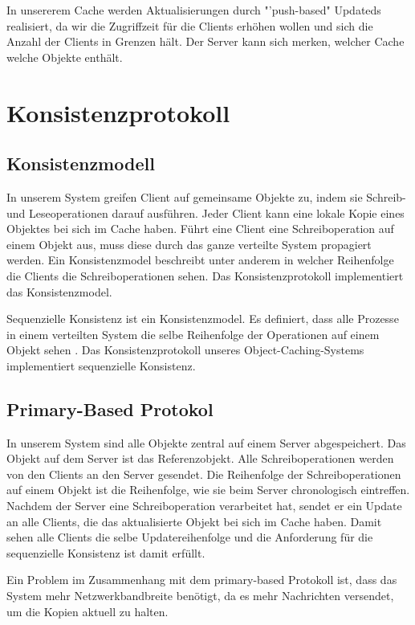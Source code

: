 In unsererem Cache werden Aktualisierungen durch "'push-based" Updateds realisiert, da wir die Zugriffzeit für die Clients erhöhen wollen und sich die Anzahl der Clients in Grenzen hält. Der Server kann sich merken, welcher Cache welche Objekte enthält.

\section{Konsistenzprotokoll}
\label{sec:konsistenzprotokoll}

\subsection{Konsistenzmodell}
\label{sec:konsistenzmodell}

In unserem System greifen Client auf gemeinsame Objekte zu, indem sie Schreib- und Leseoperationen darauf ausführen. Jeder Client kann eine lokale Kopie eines Objektes bei sich im Cache haben. Führt eine Client eine Schreiboperation auf einem Objekt aus, muss diese durch das ganze verteilte System propagiert werden.
Ein Konsistenzmodel beschreibt unter anderem in welcher Reihenfolge die Clients die Schreiboperationen sehen. Das Konsistenzprotokoll implementiert das Konsistenzmodel.

Sequenzielle Konsistenz ist ein Konsistenzmodel. Es definiert, dass alle Prozesse in einem verteilten System die selbe Reihenfolge der Operationen auf einem Objekt sehen \cite{tanenbaum07}.  Das Konsistenzprotokoll unseres Object-Caching-Systems implementiert sequenzielle Konsistenz.

\subsection{Primary-Based Protokol}
\label{sec:prim-bnased-prot}

In unserem System sind alle Objekte zentral auf einem Server abgespeichert. Das Objekt auf dem Server ist das Referenzobjekt. Alle Schreiboperationen werden von den Clients an den Server gesendet. Die Reihenfolge der Schreiboperationen auf einem Objekt ist die Reihenfolge, wie sie beim Server chronologisch eintreffen. Nachdem der Server eine Schreiboperation verarbeitet hat, sendet er ein Update an alle Clients, die das aktualisierte Objekt bei sich im Cache haben. Damit sehen alle Clients die selbe Updatereihenfolge und die Anforderung für die sequenzielle Konsistenz ist damit erfüllt. 

Ein Problem im Zusammenhang mit dem primary-based Protokoll ist, dass das System mehr Netzwerkbandbreite benötigt, da es mehr Nachrichten versendet, um die Kopien aktuell zu halten.

